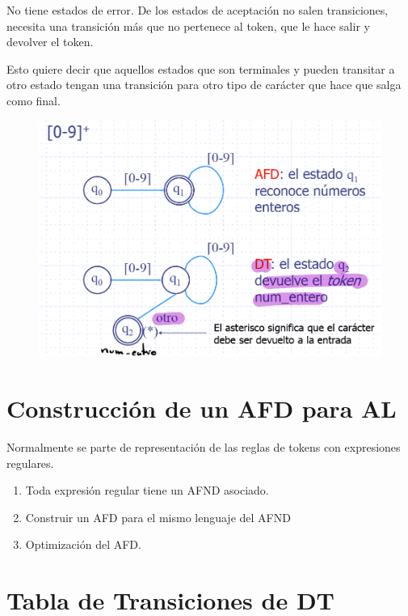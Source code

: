 \documentclass[12pt]{report} %
\begin{document}
No tiene estados de error. De los estados de aceptación no salen
transiciones, necesita una transición más que no pertenece al token, que
le hace salir y devolver el token.

Esto quiere decir que aquellos estados que son terminales y pueden
transitar a otro estado tengan una transición para otro tipo de carácter
que hace que salga como final.

\begin{figure}[H]
	{\includegraphics[scale=.25]{Untitled 30.png}}
\end{figure}

\section{Construcción de un AFD para AL}

Normalmente se parte de representación de las reglas de tokens con
expresiones regulares.

\begin{enumerate}
\def\labelenumi{\arabic{enumi}.}

\item
  Toda expresión regular tiene un AFND asociado.
\item
  Construir un AFD para el mismo lenguaje del AFND
\item
  Optimización del AFD.
\end{enumerate}


\section{Tabla de Transiciones de DT}
\end{document}
